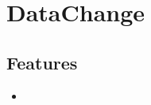 \section{DataChange}
\label{module:DataChange}
\AvailableInJavaAndCsharp{\TODO}
\subsection{Features}
\begin{itemize}
	\item {}
\end{itemize}